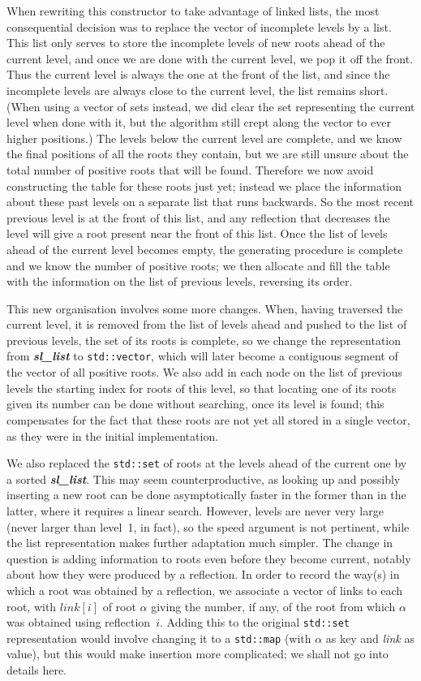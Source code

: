 \documentclass[12pt]{article}
\theoremstyle{plain}
\theoremstyle{definition}
\newcommand\std[1]{\texttt{std::#1}}
\def\vect.{\std{vector}}
\def\slls.{\textbf{\textit{sl\_\!list}}}
\begin{document}
When rewriting this constructor to take advantage of linked lists, the most
consequential decision was to replace the vector of incomplete levels by a list.
This list only serves to store the incomplete levels of new roots ahead of the
current level, and once we are done with the current level, we pop it off the
front. Thus the current level is always the one at the front of the list, and
since the incomplete levels are always close to the current level, the list
remains short. (When using a vector of sets instead, we did clear the set
representing the current level when done with it, but the algorithm still crept
along the vector to ever higher positions.) The levels below the current level
are complete, and we know the final positions of all the roots they contain, but
we are still unsure about the total number of positive roots that will be found.
Therefore we now avoid constructing the table for these roots just yet; instead
we place the information about these past levels on a separate list that runs
backwards. So the most recent previous level is at the front of this list, and
any reflection that decreases the level will give a root present near the front
of this list. Once the list of levels ahead of the current level becomes empty,
the generating procedure is complete and we know the number of positive roots;
we then allocate and fill the table with the information on the list of previous
levels, reversing its order.

This new organisation involves some more changes. When, having traversed the
current level, it is removed from the list of levels ahead and pushed to the
list of previous levels, the set of its roots is complete, so we change the
representation from \slls. to \vect., which will later become a contiguous
segment of the vector of all positive roots. We also add in each node on the
list of previous levels the starting index for roots of this level, so that
locating one of its roots given its number can be done without searching, once
its level is found; this compensates for the fact that these roots are not yet
all stored in a single vector, as they were in the initial implementation.

We also replaced the \std{set} of roots at the levels ahead of the current one
by a sorted \slls.. This may seem counterproductive, as looking up and possibly
inserting a new root can be done asymptotically faster in the former than in the
latter, where it requires a linear search. However, levels are never very large
(never larger than level~1, in fact), so the speed argument is not pertinent,
while the list representation makes further adaptation much simpler. The change
in question is adding information to roots even before they become current,
notably about how they were produced by a reflection. In order to record the
way(s) in which a root was obtained by a reflection, we associate a vector of
links to each root, with $\textit{link}[i]$ of root $\alpha$ giving the number,
if any, of the root from which $\alpha$ was obtained using reflection~$i$.
Adding this to the original \std{set} representation would involve changing it
to a \std{map} (with $\alpha$ as key and \textit{link} as value), but this would
make insertion more complicated; we shall not go into details here.
\end{document}
